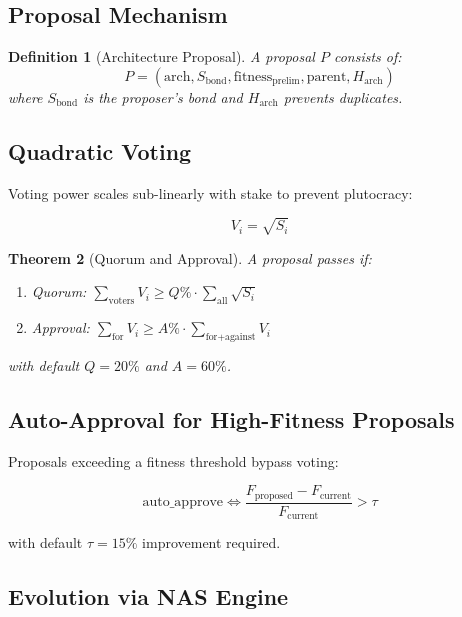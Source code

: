\documentclass[11pt,a4paper]{article}
\newtheorem{theorem}{Theorem}[section]
\newtheorem{definition}[theorem]{Definition}
\begin{document}
\subsection{Proposal Mechanism}

\begin{definition}[Architecture Proposal]
A proposal $P$ consists of:
\begin{equation}
P = (\text{arch}, S_{\text{bond}}, \text{fitness}_{\text{prelim}}, \text{parent}, H_{\text{arch}})
\end{equation}
where $S_{\text{bond}}$ is the proposer's bond and $H_{\text{arch}}$ prevents duplicates.
\end{definition}

\subsection{Quadratic Voting}

Voting power scales sub-linearly with stake to prevent plutocracy:

\begin{equation}
V_i = \sqrt{S_i}
\end{equation}

\begin{theorem}[Quorum and Approval]
A proposal passes if:
\begin{enumerate}
    \item Quorum: $\sum_{\text{voters}} V_i \geq Q\% \cdot \sum_{\text{all}} \sqrt{S_i}$
    \item Approval: $\sum_{\text{for}} V_i \geq A\% \cdot \sum_{\text{for}+\text{against}} V_i$
\end{enumerate}
with default $Q = 20\%$ and $A = 60\%$.
\end{theorem}

\subsection{Auto-Approval for High-Fitness Proposals}

Proposals exceeding a fitness threshold bypass voting:

\begin{equation}
\text{auto\_approve} \iff \frac{F_{\text{proposed}} - F_{\text{current}}}{F_{\text{current}}} > \tau
\end{equation}

with default $\tau = 15\%$ improvement required.

\subsection{Evolution via NAS Engine}
\end{document}
